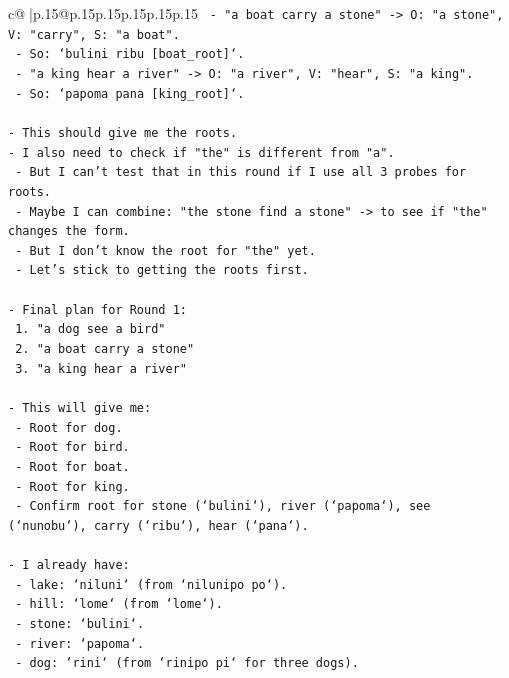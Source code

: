 \documentclass{article}
\begin{document}
{\begin{supertabular}{c@{$\;$}|p{.15\linewidth}@{}p{.15\linewidth}p{.15\linewidth}p{.15\linewidth}p{.15\linewidth}p{.15\linewidth}}
{{{\texttt{  {-} "a boat carry a stone" {-}> O: "a stone", V: "carry", S: "a boat".} \\
\texttt{  {-} So: `bulini ribu {[}boat\_root{]}`.} \\
\texttt{  {-} "a king hear a river" {-}> O: "a river", V: "hear", S: "a king".} \\
\texttt{  {-} So: `papoma pana {[}king\_root{]}`.} \\
\\ 
\texttt{{-} This should give me the roots.} \\
\texttt{{-} I also need to check if "the" is different from "a".} \\
\texttt{  {-} But I can't test that in this round if I use all 3 probes for roots.} \\
\texttt{  {-} Maybe I can combine: "the stone find a stone" {-}> to see if "the" changes the form.} \\
\texttt{  {-} But I don't know the root for "the" yet.} \\
\texttt{  {-} Let's stick to getting the roots first.} \\
\\ 
\texttt{{-} Final plan for Round 1:} \\
\texttt{  1. "a dog see a bird"} \\
\texttt{  2. "a boat carry a stone"} \\
\texttt{  3. "a king hear a river"} \\
\\ 
\texttt{{-} This will give me:} \\
\texttt{  {-} Root for dog.} \\
\texttt{  {-} Root for bird.} \\
\texttt{  {-} Root for boat.} \\
\texttt{  {-} Root for king.} \\
\texttt{  {-} Confirm root for stone (`bulini`), river (`papoma`), see (`nunobu`), carry (`ribu`), hear (`pana`).} \\
\\ 
\texttt{{-} I already have:} \\
\texttt{  {-} lake: `niluni` (from `nilunipo po`).} \\
\texttt{  {-} hill: `lome` (from `lome`).} \\
\texttt{  {-} stone: `bulini`.} \\
\texttt{  {-} river: `papoma`.} \\
\texttt{  {-} dog: `rini` (from `rinipo pi` for three dogs).} \\
}}}
\end{supertabular}}
\end{document}
